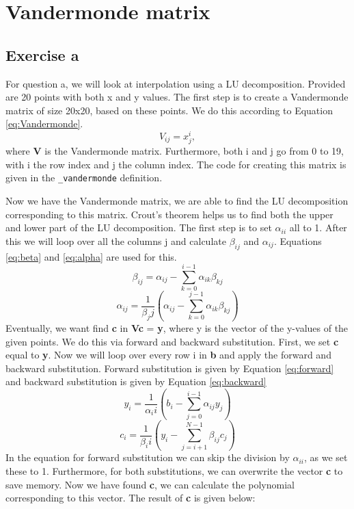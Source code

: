 \section{Vandermonde matrix}
\subsection{Exercise a}
For question a, we will look at interpolation using a LU decomposition. Provided are 20 points with both x and y values. The first step is to create a Vandermonde matrix of size 20x20, based on these points. We do this according to Equation \ref{eq:Vandermonde}.
\begin{equation}\label{eq:Vandermonde}
    V_{ij} = x^i_j,
\end{equation}
where \textbf{V} is the Vandermonde matrix. Furthermore, both i and j go from 0 to 19, with i the row index and j the column index. The code for creating this matrix is given in the \texttt{\_vandermonde} definition.  

Now we have the Vandermonde matrix, we are able to find the LU decomposition corresponding to this matrix. Crout's theorem helps us to find both the upper and lower part of the LU decomposition. The first step is to set $\alpha_{ii}$ all to 1. After this we will loop over all the columns j and calculate $\beta_{ij}$ and $\alpha_{ij}$. Equations \ref{eq:beta} and \ref{eq:alpha} are used for this.
\begin{equation}\label{eq:beta}
    \beta_{ij} = \alpha_{ij} - \sum^{i-1}_{k=0}{\alpha_{ik}\beta_{kj}}
\end{equation}
\begin{equation}\label{eq:alpha}
    \alpha_{ij} = \frac{1}{\beta_jj} \left(\alpha_{ij} - \sum^{j-1}_{k=0}{\alpha_{ik}\beta_{kj}}\right)
\end{equation}
Eventually, we want find \textbf{c} in \textbf{Vc} = \textbf{y}, where y is the vector of the y-values of the given points. We do this via forward and backward substitution. First, we set \textbf{c} equal to \textbf{y}. Now we will loop over every row i in \textbf{b} and apply the forward and backward substitution. Forward substitution is given by Equation \ref{eq:forward} and backward substitution is given by Equation \ref{eq:backward}
\begin{equation}\label{eq:forward}
    y_i = \frac{1}{\alpha_ii} \left(b_i - \sum^{i-1}_{j=0}{\alpha_{ij}y_{j}}\right)
\end{equation}
\begin{equation}\label{eq:backward}
    c_i = \frac{1}{\beta_ii} \left(y_i - \sum^{N-1}_{j=i+1}{\beta_{ij}c_{j}}\right)
\end{equation}
In the equation for forward substitution we can skip the division by $\alpha_{ii}$, as we set these to 1. Furthermore, for both substitutions, we can overwrite the vector \textbf{c} to save memory. Now we have found \textbf{c}, we can calculate the polynomial corresponding to this vector. The result of \textbf{c} is given below: 

